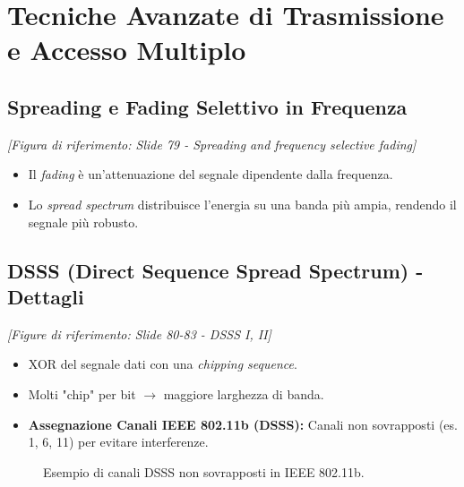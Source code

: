 \section{Tecniche Avanzate di Trasmissione e Accesso Multiplo}
\subsection{Spreading e Fading Selettivo in Frequenza}
\textit{[Figura di riferimento: Slide 79 - Spreading and frequency selective fading]}
\begin{itemize}
    \item Il \textit{fading} è un'attenuazione del segnale dipendente dalla frequenza.
    \item Lo \textit{spread spectrum} distribuisce l'energia su una banda più ampia, rendendo il segnale più robusto.
\end{itemize}

\subsection{DSSS (Direct Sequence Spread Spectrum) - Dettagli}
\textit{[Figure di riferimento: Slide 80-83 - DSSS I, II]}
\begin{itemize}
    \item XOR del segnale dati con una \textit{chipping sequence}.
    \item Molti "chip" per bit $\rightarrow$ maggiore larghezza di banda.
    \item \textbf{Assegnazione Canali IEEE 802.11b (DSSS):} Canali non sovrapposti (es. 1, 6, 11) per evitare interferenze.
\end{itemize}
\begin{figure}[H]
\centering
{}
\caption{Esempio di canali DSSS non sovrapposti in IEEE 802.11b.}
\label{fig:dsss_channels}
\end{figure}

